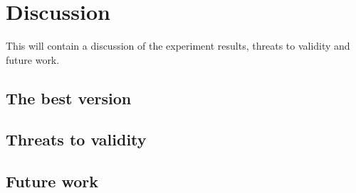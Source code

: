 \chapter{Discussion}

This will contain a discussion of the experiment results, threats to validity and future work.

\nlipsum


\section{The best version}
\nlipsum


\section{Threats to validity}
\nlipsum


\section{Future work}
\nlipsum
